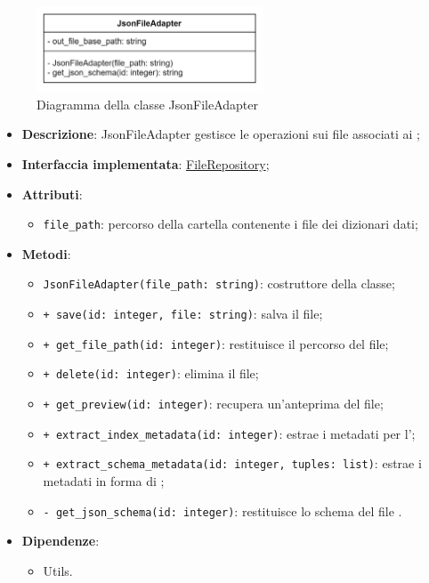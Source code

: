  \label{JsonFileAdapter}
\begin{figure}[H]
    \centering
    \includegraphics[width=0.6\textwidth]{assets/Backend/json_file_adapter.png}
    \caption{Diagramma della classe JsonFileAdapter}
  \end{figure}
\begin{itemize}
    \item \textbf{Descrizione}: JsonFileAdapter gestisce le operazioni  sui file associati ai ;
    \item \textbf{Interfaccia implementata}: \hyperref[FileRepository]{FileRepository};
    \item \textbf{Attributi}:
    \begin{itemize}
        \item \texttt{file\_path}: percorso della cartella contenente i file dei dizionari dati;
    \end{itemize}
    \item \textbf{Metodi}:
    \begin{itemize}
        \item \texttt{JsonFileAdapter(file\_path: string)}: costruttore della classe;
        \item \texttt{+ save(id: integer, file: string)}: salva il file;
        \item \texttt{+ get\_file\_path(id: integer)}: restituisce il percorso del file;
        \item \texttt{+ delete(id: integer)}: elimina il file;
        \item \texttt{+ get\_preview(id: integer)}: recupera un'anteprima del file;
        \item \texttt{+ extract\_index\_metadata(id: integer)}: estrae i metadati per l';
        \item \texttt{+ extract\_schema\_metadata(id: integer, tuples: list)}: estrae i metadati in forma di ;
        \item \texttt{- get\_json\_schema(id: integer)}: restituisce lo schema del file .
    \end{itemize}
    \item \textbf{Dipendenze}:
    \begin{itemize}
        \item Utils.
    \end{itemize}
\end{itemize} 